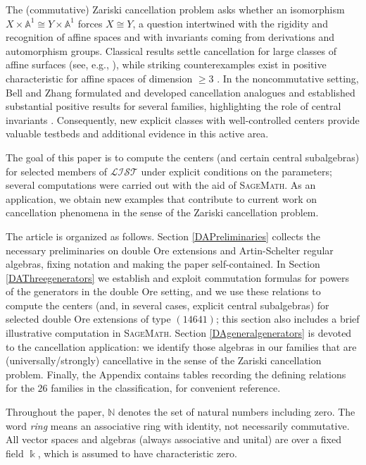 \documentclass{amsart}
\theoremstyle{definition}
\theoremstyle{remark}
\numberwithin{equation}{section}
\begin{document}
The (commutative) Zariski cancellation problem asks whether an isomorphism $X\times \mathbb{A}^1 \cong Y\times \mathbb{A}^1$ forces $X\cong Y$, a question intertwined with the rigidity and recognition of affine spaces and with invariants coming from derivations and automorphism groups. Classical results settle cancellation for large classes of affine surfaces (see, e.g., \cite{CrachiolaMakarLimanov2008}), while striking counterexamples exist in positive characteristic for affine spaces of dimension $\ge 3$ \cite{Gupta2014Inventiones, Gupta2014AdvMath}. In the noncommutative setting, Bell and Zhang formulated and developed cancellation analogues and established substantial positive results for several families, highlighting the role of central invariants \cite{BellZhang2017}. Consequently, new explicit classes with well-controlled centers provide valuable testbeds and additional evidence in this active area.

The goal of this paper is to compute the centers (and certain central subalgebras) for selected members of $\mathcal{LIST}$ under explicit conditions on the parameters; several computations were carried out with the aid of \textsc{SageMath}. As an application, we obtain new examples that contribute to current work on cancellation phenomena in the sense of the Zariski cancellation problem.

The article is organized as follows. Section \ref{DAPreliminaries} collects the necessary preliminaries on double Ore extensions and Artin-Schelter regular algebras, fixing notation and making the paper self-contained. In Section \ref{DAThreegenerators} we establish and exploit commutation formulas for powers of the generators in the double Ore setting, and we use these relations to compute the centers (and, in several cases, explicit central subalgebras) for selected double Ore extensions of type $(14641)$; this section also includes a brief illustrative computation in \textsc{SageMath}. Section \ref{DAgeneralgenerators} is devoted to the cancellation application: we identify those algebras in our families that are (universally/strongly) cancellative in the sense of the Zariski cancellation problem. Finally, the Appendix contains tables recording the defining relations for the $26$ families in the classification, for convenient reference.

Throughout the paper, $\mathbb{N}$ denotes the set of natural numbers including zero. The word \emph{ring} means an associative ring with identity, not necessarily commutative. All vector spaces and algebras (always associative and unital) are over a fixed field $\Bbbk$, which is assumed to have characteristic zero.
\end{document}
